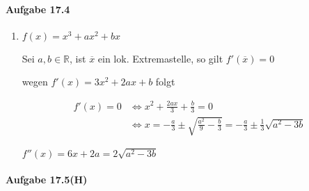 \newpage

\paragraph{Aufgabe 17.4}

\begin{enumerate}

\item[]

$f(x)=x^3+ax^2+bx$

Sei $a,b\in\mathbb{R}$, ist $\overline{x}$ ein lok. Extremastelle, so gilt $f'(\overline{x})=0$

wegen $f'(x)=3x^2+2ax+b$ folgt

\begin{align*}
f'(x)=0&\Leftrightarrow x^2+\frac{2ax}{3}+\frac{b}{3}=0\\
&\Leftrightarrow x=-\frac{a}{3}\pm\sqrt{\frac{a^2}{9}-\frac{b}{3}}=-\frac{a}{3}\pm\frac{1}{3}\sqrt{a^2-3b}
\end{align*}

$f''(x)=6x+2a=2\sqrt{a^2-3b}$

\end{enumerate}

\newpage

\paragraph{Aufgabe 17.5(H)}

